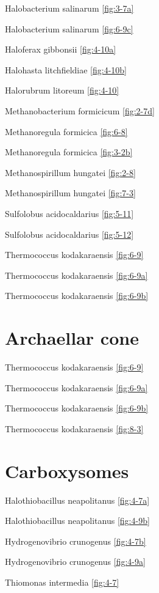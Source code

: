 \documentclass[]{tufte-book}
\begin{document}
Halobacterium salinarum \ref{fig:3-7a}

Halobacterium salinarum \ref{fig:6-9c}

Haloferax gibbonsii \ref{fig:4-10a}

Halohasta litchfieldiae \ref{fig:4-10b}

Halorubrum litoreum \ref{fig:4-10}

Methanobacterium formicicum \ref{fig:2-7d}

Methanoregula formicica \ref{fig:6-8}

Methanoregula formicica \ref{fig:3-2b}

Methanospirillum hungatei \ref{fig:2-8}

Methanospirillum hungatei \ref{fig:7-3}

Sulfolobus acidocaldarius \ref{fig:5-11}

Sulfolobus acidocaldarius \ref{fig:5-12}

Thermococcus kodakaraensis \ref{fig:6-9}

Thermococcus kodakaraensis \ref{fig:6-9a}

Thermococcus kodakaraensis \ref{fig:6-9b}

\hypertarget{archaellar-cone}{%
\section*{Archaellar cone}\label{archaellar-cone}}

Thermococcus kodakaraensis \ref{fig:6-9}

Thermococcus kodakaraensis \ref{fig:6-9a}

Thermococcus kodakaraensis \ref{fig:6-9b}

Thermococcus kodakaraensis \ref{fig:8-3}

\hypertarget{carboxysomes-1}{%
\section*{Carboxysomes}\label{carboxysomes-1}}

Halothiobacillus neapolitanus \ref{fig:4-7a}

Halothiobacillus neapolitanus \ref{fig:4-9b}

Hydrogenovibrio crunogenus \ref{fig:4-7b}

Hydrogenovibrio crunogenus \ref{fig:4-9a}

Thiomonas intermedia \ref{fig:4-7}
\end{document}
